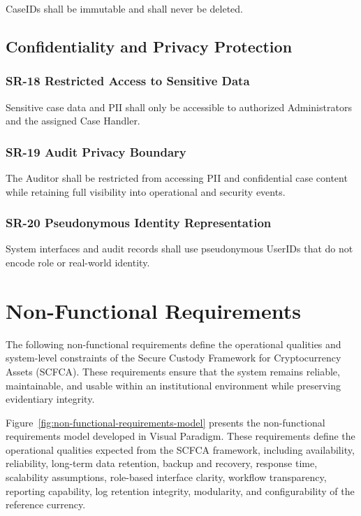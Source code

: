 \documentclass[12pt,a4paper]{report}
\begin{document}
CaseIDs shall be immutable and shall never be deleted.

\subsection{Confidentiality and Privacy Protection}

\subsubsection{SR-18 Restricted Access to Sensitive Data}

Sensitive case data and PII shall only be accessible to authorized Administrators and the assigned Case Handler.

\subsubsection{SR-19 Audit Privacy Boundary}

The Auditor shall be restricted from accessing PII and confidential case content while retaining full visibility into operational and security events.

\subsubsection{SR-20 Pseudonymous Identity Representation}

System interfaces and audit records shall use pseudonymous UserIDs that do not encode role or real-world identity.

\section{Non-Functional Requirements}

The following non-functional requirements define the operational qualities and system-level constraints of the Secure Custody Framework for Cryptocurrency Assets (SCFCA). These requirements ensure that the system remains reliable, maintainable, and usable within an institutional environment while preserving evidentiary integrity.

Figure~\ref{fig:non-functional-requirements-model} presents the non-functional requirements model developed in Visual Paradigm. These requirements define the operational qualities expected from the SCFCA framework, including availability, reliability, long-term data retention, backup and recovery, response time, scalability assumptions, role-based interface clarity, workflow transparency, reporting capability, log retention integrity, modularity, and configurability of the reference currency.
\end{document}
